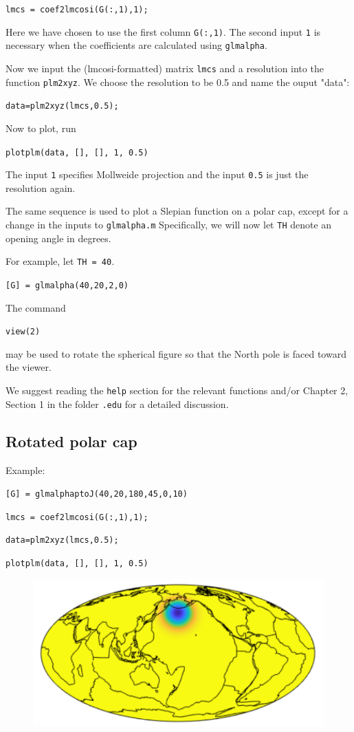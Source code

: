 \documentclass{article}
\begin{document}
\verb!lmcs = coef2lmcosi(G(:,1),1);!

Here we have chosen to use the first column \verb!G(:,1)!. The second input \verb!1! is necessary when the coefficients are calculated using \verb!glmalpha!.

Now we input the (lmcosi-formatted) matrix \verb!lmcs! and a resolution into the function \verb!plm2xyz!. We choose the resolution to be 0.5 and name the ouput "data":

\verb!data=plm2xyz(lmcs,0.5);!

\vspace{3mm}

Now to plot, run

\verb!plotplm(data, [], [], 1, 0.5)!

The input \verb!1! specifies Mollweide projection and the input \verb!0.5! is just the resolution again.

The same sequence is used to plot a Slepian function on a polar cap, except for a change in the inputs to \verb!glmalpha.m! Specifically, we will now let \verb!TH! denote an opening angle in degrees.

For example, let \verb!TH = 40!.

\verb![G] = glmalpha(40,20,2,0)!

The command 

\verb!view(2)!

may be used to rotate the spherical figure so that the North pole is faced toward the viewer.

We suggest reading the \verb!help! section for the relevant functions and/or Chapter 2, Section 1 in the folder \verb!.edu! for a detailed discussion.

\subsection{Rotated polar cap}

Example:

\vspace{3mm}

\setlength{\parskip}{.1mm}

\verb![G] = glmalphaptoJ(40,20,180,45,0,10)!

\verb!lmcs = coef2lmcosi(G(:,1),1);!

\verb!data=plm2xyz(lmcs,0.5);!

\verb!plotplm(data, [], [], 1, 0.5)!


\begin{figure}[H]
\includegraphics[scale=.75]{rotated_example}
\end{figure}
\end{document}
